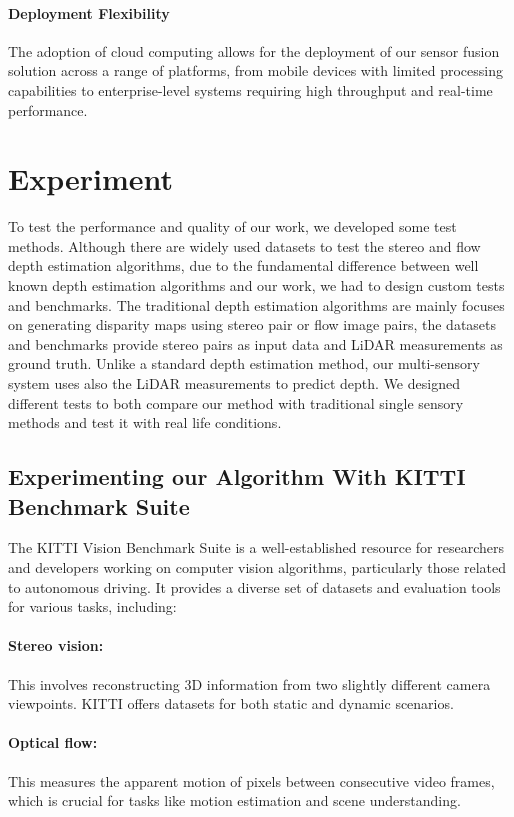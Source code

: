 \documentclass[conference]{IEEEtran}
\begin{document}
\paragraph{Deployment Flexibility} The adoption of cloud computing allows for the deployment of our sensor fusion solution across a range of platforms, from mobile devices with limited processing capabilities to enterprise-level systems requiring high throughput and real-time performance.

\section{Experiment}
To test the performance and quality of our work, we developed some test methods. Although there are widely used datasets to test the stereo and flow depth estimation algorithms, due to the fundamental difference between well known depth estimation algorithms and our work, we had to design custom tests and benchmarks.
The traditional depth estimation algorithms are mainly focuses on generating disparity maps using stereo pair or flow image pairs, the datasets and benchmarks provide stereo pairs as input data and LiDAR measurements as ground truth. Unlike a standard depth estimation method, our multi-sensory system uses also the LiDAR measurements to predict depth.
We designed different tests to both compare our method with traditional single sensory methods and test it with real life conditions.
\subsection{Experimenting our Algorithm With KITTI Benchmark Suite}
The KITTI Vision Benchmark Suite is a well-established resource for researchers and developers working on computer vision algorithms, particularly those related to autonomous driving. It provides a diverse set of datasets and evaluation tools for various tasks, including:

\paragraph{Stereo vision:} This involves reconstructing 3D information from two slightly different camera viewpoints. KITTI offers datasets for both static and dynamic scenarios.
\paragraph{Optical flow:} This measures the apparent motion of pixels between consecutive video frames, which is crucial for tasks like motion estimation and scene understanding.
\end{document}
